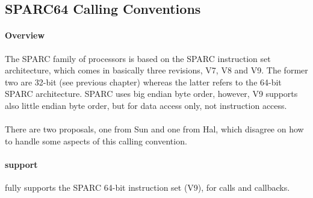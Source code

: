 %
%
%
%

\subsection{SPARC64 Calling Conventions}

\paragraph{Overview}

The SPARC family of processors is based on the SPARC instruction set architecture, which comes in basically three revisions,
V7, V8\cite{SPARCV8}\cite{SPARCSysV}\cite{SPARCCD} and V9\cite{SPARCV9}\cite{SPARCV9SysV}\cite{SPARCCD}. The former two are 32-bit (see previous chapter) whereas the latter refers to the 64-bit SPARC architecture.
SPARC uses big endian byte order, however, V9 supports also little endian byte order, but for data access only, not instruction access.\\
\\
There are two proposals, one from Sun and one from Hal, which disagree on how to handle some aspects of this calling convention.\\

\paragraph{ support}

 fully supports the SPARC 64-bit instruction set (V9), for calls and callbacks.


